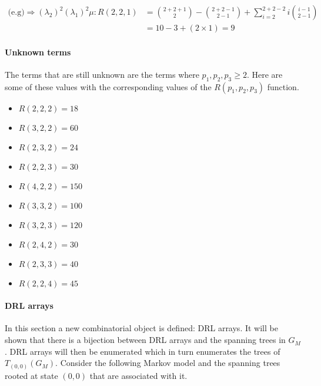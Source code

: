 \begin{align}
    \text{(e.g)} \Rightarrow (\lambda_2)^2 (\lambda_1)^2 \mu:
    R(2,2,1) & = \binom{2+2+1}{2} - \binom{2+2-1}{2-1} + \sum_{i=2}^{2+2-2}
    i\binom{i-1}{2-1} \nonumber \\
    & = 10 - 3 + (2 \times 1) = 9 \nonumber
\end{align}
\normalsize

\paragraph{Unknown terms}

The terms that are still unknown are the terms where \(p_1, p_2, p_3 \geq 2\).
Here are some of these values with the corresponding values of the
\(R(p_1,p_2,p_3)\) function.

\begin{multicols}{2}
    \begin{itemize}
        \item \(R(2,2,2) = 18\)
        \item \(R(3,2,2) = 60\)
        \item \(R(2,3,2) = 24\)
        \item \(R(2,2,3) = 30\)
        \item \(R(4,2,2) = 150\)
        \item \(R(3,3,2) = 100\)
        \item \(R(3,2,3) = 120\)
        \item \(R(2,4,2) = 30\)
        \item \(R(2,3,3) = 40\)
        \item \(R(2,2,4) = 45\)
    \end{itemize}
\end{multicols}

\paragraph{DRL arrays}

In this section a new combinatorial object is defined: DRL arrays.
It will be shown that there is a bijection between DRL arrays and the spanning
trees in \(G_M\).
DRL arrays will then be enumerated which in turn enumerates the trees of
\(T_{(0,0)}(G_M)\).
Consider the following Markov model and the spanning trees rooted at state
\((0,0)\) that are associated with it.

